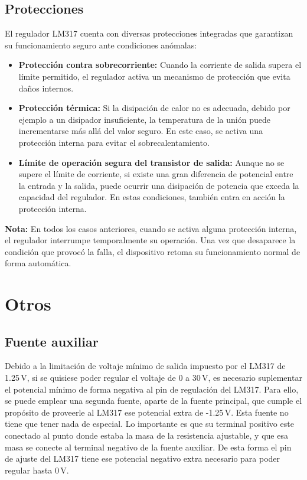 \documentclass[chaptersright]{informeutn}
\begin{document}
        \subsection{Protecciones}
          El regulador LM317 cuenta con diversas protecciones integradas que garantizan su funcionamiento seguro ante
          condiciones anómalas:
          \begin{itemize}
              \item \textbf{Protección contra sobrecorriente:} Cuando la corriente de salida supera el límite
                permitido, el regulador activa un mecanismo de protección que evita daños internos.
              \item \textbf{Protección térmica:} Si la disipación de calor no es adecuada, debido por ejemplo a un
                disipador insuficiente, la temperatura de la unión puede incrementarse más allá del valor seguro. En
                este caso, se activa una protección interna para evitar el sobrecalentamiento.
              \item \textbf{Límite de operación segura del transistor de salida:} Aunque no se supere el límite de
                corriente, si existe una gran diferencia de potencial entre la entrada y la salida, puede ocurrir una
                disipación de potencia que exceda la capacidad del regulador. En estas condiciones, también entra en
                acción la protección interna.
          \end{itemize}

          \textbf{Nota:} En todos los casos anteriores, cuando se activa alguna protección interna, el regulador
            interrumpe temporalmente su operación. Una vez que desaparece la condición que provocó la falla, el
            dispositivo retoma su funcionamiento normal de forma automática.

      \section{Otros}
        \subsection{Fuente auxiliar}
          Debido a la limitación de voltaje mínimo de salida impuesto por el LM317 de 1.25\,V, si se quisiese poder
          regular el voltaje de 0 a 30\,V, es necesario suplementar el potencial mínimo de forma negativa al pin de
          regulación del LM317. Para ello, se puede emplear una segunda fuente, aparte de la fuente principal, que
          cumple el propósito de proveerle al LM317 ese potencial extra de -1.25\,V. Esta fuente no tiene que tener nada
          de especial. Lo importante es que su terminal positivo este conectado al punto donde estaba la masa de la
          resistencia ajustable, y que esa masa se conecte al terminal negativo de la fuente auxiliar. De esta forma
          el pin de ajuste del LM317 tiene ese potencial negativo extra necesario para poder regular hasta 0\,V.
\end{document}
